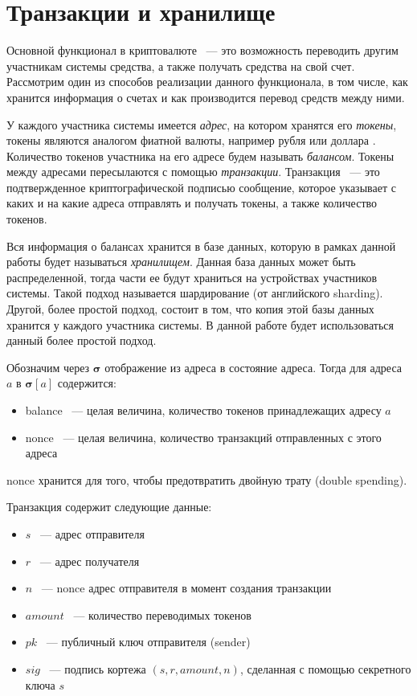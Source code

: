 \section{Транзакции и хранилище} \label{sec:tx}
Основной функционал в криптовалюте ~--- это возможность переводить другим участникам системы средства, а также получать средства на свой счет.
Рассмотрим один из способов реализации данного функционала,
в том числе, как хранится информация о счетах и как производится перевод средств между ними.

У каждого участника системы имеется \textit{адрес}, на котором хранятся его \textit{токены}, токены
являются аналогом фиатной валюты, например рубля или доллара . Количество токенов участника на его адресе будем называть \textit{балансом}. Токены между адресами пересылаются с помощью \textit{транзакции}. Транзакция ~--- это подтвержденное криптографической подписью сообщение, которое указывает с каких и на какие адреса отправлять и получать токены, а также количество токенов.

Вся информация о балансах хранится в базе данных, которую в рамках данной работы будет называться \textit{хранилищем}.
Данная база данных может быть распределенной, тогда части ее будут храниться на устройствах участников системы. 
Такой подход называется шардирование (от английского sharding). 
Другой, более простой подход, состоит в том, что копия этой базы данных хранится у каждого участника системы.
В данной работе будет использоваться данный более простой подход.

Обозначим через $\boldsymbol{\sigma}$ отображение из адреса в состояние адреса. Тогда для адреса $a$ в $\boldsymbol{\sigma}[a]$ содержится:
\begin{itemize}
\item balance ~--- целая величина, количество токенов принадлежащих адресу $a$
\item nonce  ~--- целая величина, количество транзакций отправленных с этого адреса
\end{itemize}

nonce хранится для того, чтобы предотвратить двойную трату (double spending)\cite{double-spending}.

\noindent Транзакция содержит следующие данные:
\begin{itemize}
\item $s$ ~--- адрес отправителя
\item $r$ ~--- адрес получателя
\item $n$ ~--- nonce адрес отправителя в момент создания транзакции
\item $amount$ ~--- количество переводимых токенов
\item $pk$ ~--- публичный ключ отправителя (sender)
\item $sig$ ~--- подпись кортежа $(s, r, amount, n)$, сделанная с помощью секретного ключа $s$
\end{itemize}

